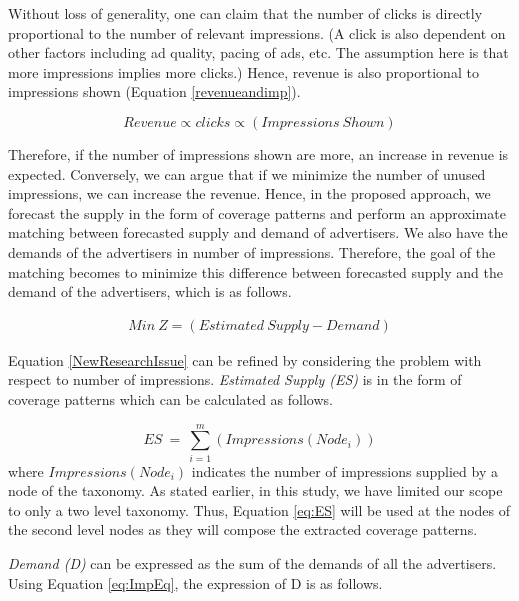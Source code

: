 \begin{enumerate}[label=(\Alph*)]
Without loss of generality, one can claim that the number of clicks is directly proportional to the number of relevant impressions. (A click is also dependent on other factors including ad quality, pacing of ads, etc. The assumption here is that more impressions implies more clicks.) Hence, revenue is also proportional to impressions shown (Equation \ref{revenueandimp}).

\begin{equation}
    Revenue \propto clicks \propto (Impressions\ Shown)
    \label{revenueandimp}
\end{equation}

Therefore, if the number of impressions shown are more, an increase in revenue is expected. Conversely, we can argue that if we minimize the number of unused impressions, we can increase the revenue. Hence, in the proposed approach, we forecast the supply in the form of coverage patterns and perform an approximate matching between forecasted supply and demand of advertisers. We also have the demands of the advertisers in number of impressions. Therefore, the goal of the matching becomes to minimize this difference between forecasted supply and the demand of the advertisers, which is as follows.

\begin{equation}
    \begin{aligned}
    Min\ Z = (Estimated\ Supply - Demand)
    \end{aligned}
    \label{NewResearchIssue}
\end{equation}

Equation \ref{NewResearchIssue} can be refined by considering the problem with respect to number of impressions. \textit{Estimated Supply (ES)} is in the form of coverage patterns which can be calculated as follows.

\begin{equation}
ES\ =\ \sum_{i=1}^{m} (Impressions(Node_{i}))
\label{eq:ES}
\end{equation}
where $Impressions(Node_{i})$ indicates the number of impressions supplied by a node of the taxonomy. As stated earlier, in this study, we have limited our scope to only a two level taxonomy. Thus, Equation \ref{eq:ES} will be used at the nodes of the second level nodes as they will compose the extracted coverage patterns.

\textit{Demand (D)} can be expressed as the sum of the demands of all the advertisers. Using Equation \ref{eq:ImpEq}, the expression of D is as follows.


\end{enumerate}
